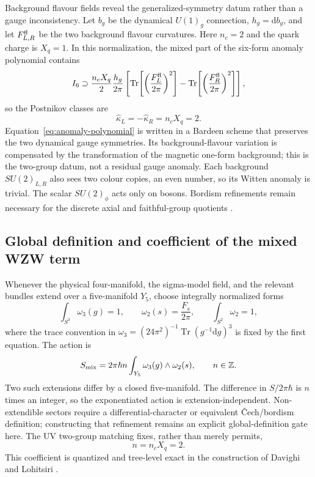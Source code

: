 \documentclass[11pt]{article}
\theoremstyle{definition}
\theoremstyle{remark}
\newcommand{\dd}{\mathrm d}
\newcommand{\ZZ}{\mathbb Z}
\newcommand{\Tr}{\operatorname{Tr}}
\begin{document}
Background flavour fields reveal the generalized-symmetry datum rather than
a gauge inconsistency.  Let \(b_g\) be the dynamical \(U(1)_g\) connection,
\(h_g=\dd b_g\), and let \(F_{L,R}^{\rm fl}\) be the two background flavour
curvatures.  Here \(n_c=2\) and the quark charge is \(X_q=1\).  In this
normalization, the mixed part of the six-form anomaly polynomial contains
\begin{equation}
 I_6\supset\frac{n_cX_q}{2}\frac{h_g}{2\pi}
 \left[
 \Tr\!\left[\left(\frac{F_L^{\rm fl}}{2\pi}\right)^2\right]
 -\Tr\!\left[\left(\frac{F_R^{\rm fl}}{2\pi}\right)^2\right]
 \right],
 \label{eq:anomaly-polynomial}
\end{equation}
so the Postnikov classes are
\begin{equation}
 \widehat\kappa_L=-\widehat\kappa_R=n_cX_q=2.
 \label{eq:postnikov-two}
\end{equation}
Equation~\eqref{eq:anomaly-polynomial} is written in a Bardeen scheme that
preserves the two dynamical gauge symmetries.  Its background-flavour
variation is compensated by the transformation of the magnetic one-form
background; this is the two-group datum, not a residual gauge anomaly.
Each background \(SU(2)_{L,R}\) also sees two colour copies, an even number,
so its Witten anomaly is trivial.  The scalar \(SU(2)_\phi\) acts only on
bosons.  Bordism refinements remain necessary for the discrete axial and
faithful-group quotients \cite{Saito2024APE3UV,LeeOhmoriTachikawa2021}.

\subsection{Global definition and coefficient of the mixed WZW term}

Whenever the physical four-manifold, the sigma-model field, and the relevant
bundles extend over a five-manifold \(Y_5\), choose integrally normalized forms
\begin{equation}
 \int_{S^3}\omega_3(g)=1,
 \qquad
 \omega_2(s)=\frac{F_s}{2\pi},
 \qquad \int_{S^2}\omega_2=1,
 \label{eq:integral-forms}
\end{equation}
where the trace convention in
\(\omega_3=(24\pi^2)^{-1}\Tr(g^{-1}\dd g)^3\) is fixed by the first equation.
The action is
\begin{equation}
 S_{\rm mix}=2\pi\hbar n\int_{Y_5}\omega_3(g)\wedge\omega_2(s),
 \qquad n\in\ZZ.
 \label{eq:mixed-action}
\end{equation}
Two such extensions differ by a closed five-manifold.  The difference in
\(S/2\pi\hbar\) is \(n\) times an integer, so the exponentiated action is
extension-independent.  Non-extendible sectors require a differential-character
or equivalent \v{C}ech/bordism definition; constructing that refinement remains
an explicit global-definition gate here.  The UV two-group matching fixes,
rather than merely permits,
\begin{equation}
 \boxed{n=n_cX_q=2.}
 \label{eq:wzw-level-two}
\end{equation}
This coefficient is quantized and tree-level exact in the construction of
Davighi and Lohitsiri \cite{DavighiLohitsiri2024APE3UV}.
\end{document}
